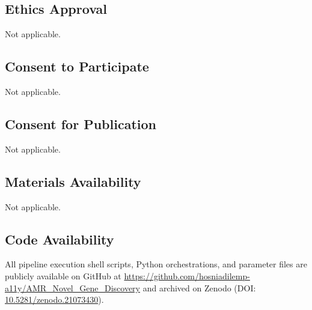 \documentclass[pdflatex,sn-mathphys-num]{sn-jnl}
\begin{document}
\subsection*{Ethics Approval}
Not applicable.

\subsection*{Consent to Participate}
Not applicable.

\subsection*{Consent for Publication}
Not applicable.

\subsection*{Materials Availability}
Not applicable.

\subsection*{Code Availability}
All pipeline execution shell scripts, Python orchestrations, and parameter files are publicly available on GitHub at \href{https://github.com/hosniadilemp-a11y/AMR_Novel_Gene_Discovery}{https://github.com/hosniadilemp-a11y/AMR\_Novel\_Gene\_Discovery} and archived on Zenodo (DOI: \href{https://doi.org/10.5281/zenodo.21073430}{10.5281/zenodo.21073430}).
\end{document}
